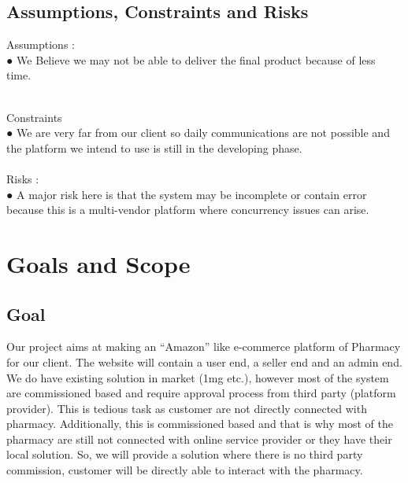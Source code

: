 \documentclass[
10pt, %
a4paper, %
oneside, %
headinclude,footinclude, %
BCOR5mm, %
]{scrartcl}
\begin{document}
\subsection{Assumptions, Constraints and Risks}

Assumptions :
\vspace{0.5cm}
\\●  We Believe we may not be able to deliver the final product because of less time.
\vspace{0.5cm}

\\Constraints
\vspace{0.5cm}
\\●	We are very far from our client so daily communications are not possible and the platform we intend to use is still in the developing phase.\\
\vspace{0.5cm}
\\Risks :
\vspace{0.5cm}
\\●	A major risk here is that the system may be incomplete or contain error because this is a multi-vendor platform where concurrency issues can arise.\\

\vspace{0.5cm}

 

\section{Goals and Scope}


\subsection{Goal}
Our project aims at  making an “Amazon” like e-commerce platform of Pharmacy for our client. The website will contain a user end, a seller end and an admin end. We do have existing solution in market (1mg etc.), however most of the system are commissioned based and require approval process from third party (platform provider). This is tedious task as customer are not directly connected with pharmacy. Additionally, this is commissioned based and that is why most of the pharmacy are still not connected with online service provider or they have their local solution. So, we will provide a solution where there is no third party commission, customer will be directly able to interact with the pharmacy.
\end{document}

